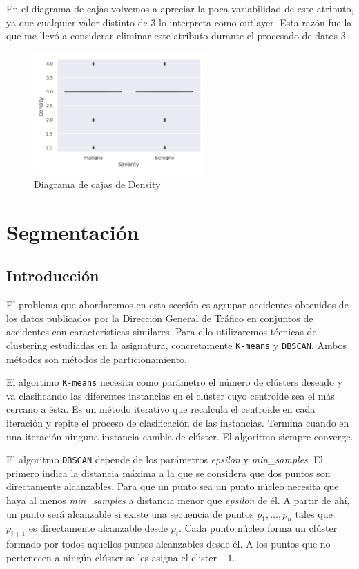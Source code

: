 \documentclass[a4]{article}
\begin{document}
En el diagrama de cajas volvemos a apreciar la poca variabilidad de este atributo, ya que cualquier valor distinto de $3$ lo interpreta como outlayer. Esta razón fue la que me llevó a considerar eliminar este atributo durante el procesado de datos $3$.

\begin{figure}[H]
  \centering
  \caption{Diagrama de cajas de Density}
  \includegraphics[width=65mm]{imagenes/bp_density}
\end{figure}

\section{Segmentación}

\subsection{Introducción}

El problema que abordaremos en esta sección es agrupar accidentes obtenidos de los datos publicados por la Dirección General de Tráfico  en conjuntos de accidentes con características similares. Para ello utilizaremos técnicas de clustering estudiadas en la asignatura, concretamente \texttt{K-means} y \texttt{DBSCAN}. Ambos métodos son métodos de particionamiento.

El algortimo \texttt{K-means} necesita como parámetro el número de clústers deseado y va clasificando las diferentes instancias en el clúster cuyo centroide sea el más cercano a ésta. Es un método iterativo que recalcula el centroide en cada iteración y repite el proceso de clasificación de las instancias. Termina cuando en una iteración ninguna instancia cambia de clúster. El algoritmo siempre converge.

El algoritmo \texttt{DBSCAN} depende de los parámetros \textit{epsilon} y \textit{min\_samples}. El primero indica la distancia máxima a la que se considera que dos puntos son directamente alcanzables. Para que un punto sea un punto núcleo necesita que haya al menos \textit{min\_samples} a distancia menor que \textit{epsilon} de él. A partir de ahí, un punto será alcanzable si existe una secuencia de puntos $p_1, \ldots, p_n$ tales que $p_{i+1}$ es directamente alcanzable desde $p_i$. Cada punto núcleo forma un clúster formado por todos aquellos puntos alcanzables desde él. A los puntos que no pertenecen a ningún clúster se les asigna el clister $-1$.
\end{document}
